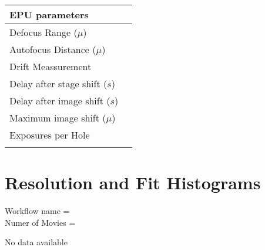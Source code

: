 \documentclass[12pt,a4paper]{article}
\newif\iflong
\begin{document}
%
  \hspace{1cm}
%
\begin{tabulary}{\linewidth}{L p{3cm}}
  \\\hline
  EPU parameters &  \\\hline
  Defocus Range ($\mu$)&  \\\hline
  Autofocus Distance ($\mu$) & 
       \\\hline
  Drift Meassurement  &
       \\\hline %
  Delay after stage shift ($s$) & 
       \\\hline
  Delay after image shift ($s$) &
       \\\hline
  Maximum image shift ($\mu$) &
       \\\hline
  Exposures per Hole&
       \\\hline
      &\\
\end{tabulary}

\newpage
\section*{Resolution and Fit Histograms}

Workflow name = \\
Numer of Movies = 
\iflong
\begin{figure}[!htbp]
    \caption{Resolution Histogram.\label{fig:resHist}}
    \centering
    }
\end{figure}

\begin{figure}[!htbp]
    \caption{Defocus Histogram.\label{fig:defHist}}
    \centering
    }
\end{figure}
\else
No data available
\fi
\end{document}
